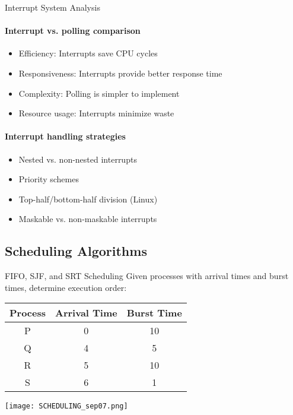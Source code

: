 \begin{KR}{Interrupt System Analysis}
    \paragraph{Interrupt vs. polling comparison}
    \begin{itemize}
        \item Efficiency: Interrupts save CPU cycles
        \item Responsiveness: Interrupts provide better response time
        \item Complexity: Polling is simpler to implement
        \item Resource usage: Interrupts minimize waste
    \end{itemize}
    
    \paragraph{Interrupt handling strategies}
    \begin{itemize}
        \item Nested vs. non-nested interrupts
        \item Priority schemes
        \item Top-half/bottom-half division (Linux)
        \item Maskable vs. non-maskable interrupts
    \end{itemize}
\end{KR}

\subsection{Scheduling Algorithms}

\begin{example2}{FIFO{,} SJF{,} and SRT Scheduling}
    Given processes with arrival times and burst times, determine execution order:
    
    \begin{tabular}{|c|c|c|}
        \hline
        Process & Arrival Time & Burst Time \\
        \hline
        P & 0 & 10 \\
        Q & 4 & 5 \\
        R & 5 & 10 \\
        S & 6 & 1 \\
        \hline
    \end{tabular}
    
    \tcblower
    
    \texttt{[image: SCHEDULING\_sep07.png]}
\end{example2}

